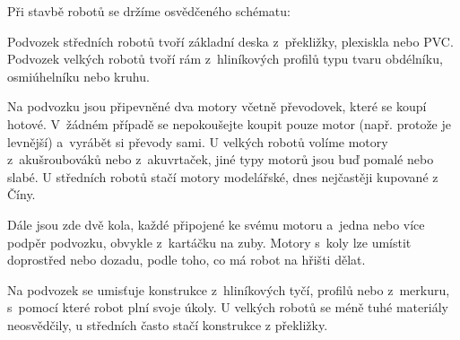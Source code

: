 Při stavbě robotů se držíme osvědčeného schématu: 

Podvozek středních robotů tvoří základní deska z~překližky, plexiskla nebo PVC. 
Podvozek velkých robotů tvoří rám z~hliníkových profilů typu  tvaru obdélníku, osmiúhelníku nebo kruhu. 

Na podvozku jsou  připevněné dva motory včetně převodovek, které se koupí hotové. 
V~žádném případě se nepokoušejte koupit pouze motor (např. protože je levnější) a~vyrábět si převody sami.  
U velkých robotů volíme motory z~akušroubováků nebo z~akuvrtaček, jiné typy motorů jsou buď pomalé nebo slabé.
U středních robotů stačí motory modelářské, dnes nejčastěji kupované z Číny.

Dále jsou zde dvě kola, každé připojené ke svému motoru a~jedna nebo více podpěr podvozku, 
obvykle z~kartáčku na zuby.
Motory s~koly lze umístit doprostřed nebo dozadu, podle toho, co má robot na hřišti dělat. 

Na podvozek se umisťuje konstrukce z~hliníkových tyčí, profilů nebo z~merkuru, s~pomocí které robot plní svoje úkoly. 
U velkých robotů se méně tuhé materiály neosvědčily, u středních často stačí konstrukce z překližky.     